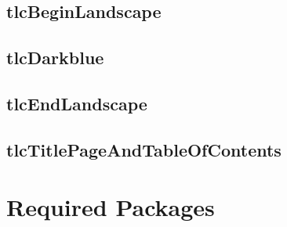 \documentclass[12pt]{tlc-article}
\begin{document}
\subsection{tlcBeginLandscape}
\subsection{tlcDarkblue}
\subsection{tlcEndLandscape}
\subsection{tlcTitlePageAndTableOfContents}

\section{Required Packages}

\end{document}
